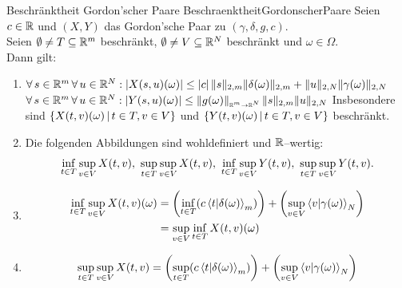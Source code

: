 \begin{lemma}{Beschränktheit Gordon'scher Paare}
             {BeschraenktheitGordonscherPaare}
Seien $c \in \mathbb{R}$ und $(X, Y)$ das Gordon'sche Paar zu $(\gamma,\delta,g,c)$.\\
Seien $\emptyset \neq T \subseteq \mathbb{R}^m$ beschränkt,
$\emptyset \neq V \subseteq \mathbb{R}^N$ beschränkt und $\omega \in \Omega$.\\
Dann gilt:
\begin{enumerate}[(1)]
	\item \label{BeschraenktheitGordonscherPaare1}
	$\forall\, s \in \mathbb{R}^m\, \forall\, u \in \mathbb{R}^N: 
	\left|X(s,u)(\omega)\right| \le \left|c\right|\lVert s\rVert_{2, m}\lVert\delta(\omega)\rVert_{2,m}
	+ \lVert u\rVert_{2, N} \lVert\gamma(\omega)\rVert_{2, N}$\absatz
	$\forall\, s \in \mathbb{R}^m\, \forall\, u \in \mathbb{R}^N: \left|Y(s,u)(\omega)\right|
	\le \left\|g(\omega)\right\|_{\scriptscriptstyle{\ensuremath{\mathbb{R}}^m \rightarrow \ensuremath{\mathbb{R}}^N}}\lVert s\rVert_{2, m} \lVert u\rVert_{2, N}$\absatz
	Insbesondere sind 
	$\left\{X(t, v)(\omega)\,|\,t \in T, v \in V\right\}$ und 
	$\left\{Y(t, v)(\omega)\,|\,t \in T, v \in V\right\}$ beschränkt.
  \item \label{BeschraenktheitGordonscherPaare2}
  Die folgenden Abbildungen sind wohldefiniert und $\mathbb{R}$--wertig:
  \[\inf_{t \in T}\sup_{v \in V}X(t, v), \  
    \sup_{t \in T}\sup_{v \in V}X(t, v), \ 
    \inf_{t \in T}\sup_{v \in V}Y(t, v), \ 
    \sup_{t \in T}\sup_{v \in V}Y(t, v)\text.\]
  \item \label{BeschraenktheitGordonscherPaare3}
  \begin{align*}
  \inf_{t \in T}\sup_{v \in V}X(t, v)(\omega)
  &= \left(\inf_{t \in T}(c\left\langle t |\delta(\omega)\right\rangle _m) \right)
  + \left(\sup_{v \in V}\left\langle v |\gamma(\omega)\right\rangle_N \right)\\
  &= \sup_{v \in V}\inf_{t \in T}X(t, v)(\omega)
  \end{align*}
  \item \label{BeschraenktheitGordonscherPaare4}
  \[\sup_{t \in T}\sup_{v \in V}X(t, v) = 
  \left(\sup_{t \in T}(c\left\langle t |\delta(\omega)\right\rangle _m) \right)
  + \left(\sup_{v \in V}\left\langle v |\gamma(\omega)\right\rangle_N \right)\]
\end{enumerate}
\end{lemma}
